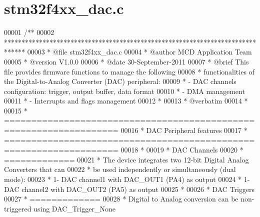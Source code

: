 \section{stm32f4xx\+\_\+dac.\+c}
\label{stm32f4xx__dac_8c_source}

\begin{DoxyCode}
00001 \textcolor{comment}{/**}
00002 \textcolor{comment}{  ******************************************************************************}
00003 \textcolor{comment}{  * @file    stm32f4xx\_dac.c}
00004 \textcolor{comment}{  * @author  MCD Application Team}
00005 \textcolor{comment}{  * @version V1.0.0}
00006 \textcolor{comment}{  * @date    30-September-2011}
00007 \textcolor{comment}{   * @brief   This file provides firmware functions to manage the following }
00008 \textcolor{comment}{  *          functionalities of the Digital-to-Analog Converter (DAC) peripheral: }
00009 \textcolor{comment}{  *           - DAC channels configuration: trigger, output buffer, data format}
00010 \textcolor{comment}{  *           - DMA management      }
00011 \textcolor{comment}{  *           - Interrupts and flags management}
00012 \textcolor{comment}{  *}
00013 \textcolor{comment}{  *  @verbatim}
00014 \textcolor{comment}{  *    }
00015 \textcolor{comment}{  *          ===================================================================}
00016 \textcolor{comment}{  *                             DAC Peripheral features}
00017 \textcolor{comment}{  *          ===================================================================}
00018 \textcolor{comment}{  *          }
00019 \textcolor{comment}{  *          DAC Channels}
00020 \textcolor{comment}{  *          =============  }
00021 \textcolor{comment}{  *          The device integrates two 12-bit Digital Analog Converters that can }
00022 \textcolor{comment}{  *          be used independently or simultaneously (dual mode):}
00023 \textcolor{comment}{  *            1- DAC channel1 with DAC\_OUT1 (PA4) as output}
00024 \textcolor{comment}{  *            1- DAC channel2 with DAC\_OUT2 (PA5) as output}
00025 \textcolor{comment}{  *}
00026 \textcolor{comment}{  *          DAC Triggers}
00027 \textcolor{comment}{  *          =============}
00028 \textcolor{comment}{  *          Digital to Analog conversion can be non-triggered using DAC\_Trigger\_None}

\end{DoxyCode}
